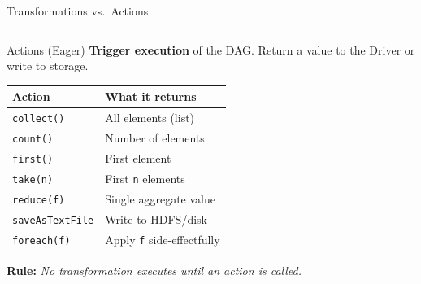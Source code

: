 \documentclass[aspectratio=169,10pt]{beamer}
\begin{document}
\begin{frame}{Transformations vs.\ Actions}
\begin{columns}[T]
      \begin{exampleblock}{Actions (Eager)}
        \textbf{Trigger execution} of the DAG.  Return a value to the Driver or write to storage.
        \vspace{4pt}
        \renewcommand{\arraystretch}{1.2}
        \begin{tabular}{p{2.3cm}p{2.5cm}}
          \toprule
          \textbf{Action} & \textbf{What it returns} \\
          \midrule
          \texttt{collect()}      & All elements (list) \\
          \texttt{count()}        & Number of elements \\
          \texttt{first()}        & First element \\
          \texttt{take(n)}        & First \texttt{n} elements \\
          \texttt{reduce(f)}      & Single aggregate value \\
          \texttt{saveAsTextFile} & Write to HDFS/disk \\
          \texttt{foreach(f)}     & Apply \texttt{f} side-effectfully \\
          \bottomrule
        \end{tabular}
        \vspace{4pt}
        \textbf{Rule:} \textit{No transformation executes until an action is called.}
      \end{exampleblock}
  \end{columns}
\end{frame}
\end{document}
